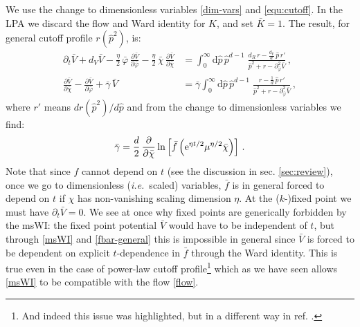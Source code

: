 \documentclass[11pt]{book} %
\newcommand\ie{\textit{i.e.}\ }
\newcommand{\bc}{\bar \chi}
\newcommand{\bV}{\bar V}
\numberwithin{equation}{chapter}
\begin{document}
We use the change to dimensionless variables \eqref{dim-vars} and \eqref{equ:cutoff}.
In the LPA we discard the flow and Ward identity for $K$, and set $\bar K=1$.
The result, for general cutoff profile $r(\hat{p}^2)$, is:
\begin{align}
  \label{flow}
  \partial_t \bar V + d_V \bar V - \frac{\eta}{2} \, \bar\varphi \, \frac{\partial \bar V}{\partial \bar\varphi} - \frac{\eta}{2} \, \bar\chi \, \frac{\partial \bar V}{\partial \bar\chi} &=
  \int_0^{\infty} \mathrm d\hat p \, \hat p^{d-1} \; \frac{d_R\, r - \frac{d_V}{d} \, \hat p \, r'}{\hat p^2 + r - \partial^2_{\bar\varphi}\bar V}\,,\\
  \label{msWI}
  \frac{\partial \bar V}{\partial \bar\chi} - \frac{\partial \bar V}{\partial \bar\varphi} + \bar \gamma \, \bar V &= \bar \gamma
  \int_0^{\infty} \mathrm d\hat p \, \hat p^{d-1} \; \frac{r - \frac{1}{d} \, \hat p \, r'}{\hat p^2 + r - \partial^2_{\bar\varphi}\bar V} \,,
\end{align}
where $r'$ means $dr(\hat{p}^2)/d\hat{p}$ and from the change to dimensionless variables we find:
\begin{align}
  \label{fbar-general}
  \bar{\gamma} = \frac{d}{2} \, \frac{\partial}{\partial\bc}\ln
  \left[
    \bar{f}\left({\rm e}^{\eta t/2}\mu^{\eta/2}\bc\right)
  \right]\,.
\end{align}
Note that since $f$ cannot depend on $t$ (see the discussion in sec. \ref{sec:review}),
once we go to dimensionless (\ie scaled) variables, $\bar{f}$ is in general forced to depend on
$t$ if $\chi$ has non-vanishing scaling dimension $\eta$.
At the ($k$-)fixed point we must have $\partial_t \bar V = 0$. We see at once why fixed points are
generically forbidden by the msWI: the fixed point potential $\bar{V}$ would have to be independent of $t$,
but through \eqref{msWI} and \eqref{fbar-general} this is impossible in general since $\bV$ is forced
to be dependent on explicit $t$-dependence in $\bar{f}$ through the Ward identity.
This is true even in the case of power-law cutoff profile\footnote{And indeed this issue was highlighted,
but in a different way in ref. \cite{Dietz:2015owa}.} which as we have seen allows \eqref{msWI} to be
compatible with the flow \eqref{flow}.
\end{document}
